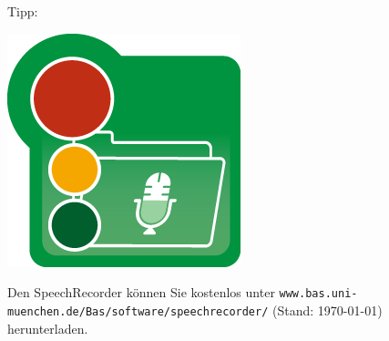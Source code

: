 \documentclass[11pt]{book}
\begin{document}
Tipp: \newline \\ 
\begin {minipage} {0.1\textwidth}
\includegraphics[width=\textwidth]{grafiken/sprachaufnahme/speechrecorder.png}
\end{minipage}
\hspace{1cm}
\begin{minipage} {0.6\textwidth}
Den SpeechRecorder können Sie kostenlos unter {\tt www.bas.uni-muenchen.de/Bas/software/speechrecorder/} (Stand: \today) herunterladen.
\end {minipage}
\end{document}
